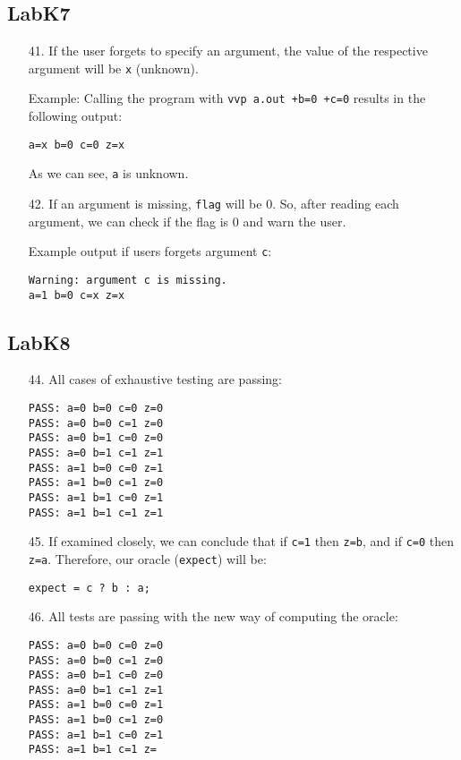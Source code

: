 \documentclass{article}
\begin{document}
\subsection{LabK7}
\begin{enumerate}
\item[41. ] If the user forgets to specify an argument, the value of the respective argument will be \verb$x$ (unknown).

Example: Calling the program with \verb$vvp a.out +b=0 +c=0$ results in the following output:
\begin{verbatim}
a=x b=0 c=0 z=x
\end{verbatim}

As we can see, \verb$a$ is unknown.

\item[42. ] If an argument is missing, \verb$flag$ will be 0. So, after reading each argument, we can check if the flag is 0 and warn the user.

Example output if users forgets argument \verb$c$:
\begin{verbatim}
Warning: argument c is missing.
a=1 b=0 c=x z=x
\end{verbatim}

\end{enumerate}

\subsection{LabK8}
\begin{enumerate}
\item[44. ] All cases of exhaustive testing are passing:
\begin{verbatim}
PASS: a=0 b=0 c=0 z=0
PASS: a=0 b=0 c=1 z=0
PASS: a=0 b=1 c=0 z=0
PASS: a=0 b=1 c=1 z=1
PASS: a=1 b=0 c=0 z=1
PASS: a=1 b=0 c=1 z=0
PASS: a=1 b=1 c=0 z=1
PASS: a=1 b=1 c=1 z=1
\end{verbatim}

\item[45. ] If examined closely, we can conclude that if \verb$c=1$ then \verb$z=b$, and if \verb$c=0$ then \verb$z=a$. Therefore, our oracle (\verb$expect$) will be:

\verb$expect = c ? b : a;$

\item[46. ] All tests are passing with the new way of computing the oracle:
\begin{verbatim}
PASS: a=0 b=0 c=0 z=0
PASS: a=0 b=0 c=1 z=0
PASS: a=0 b=1 c=0 z=0
PASS: a=0 b=1 c=1 z=1
PASS: a=1 b=0 c=0 z=1
PASS: a=1 b=0 c=1 z=0
PASS: a=1 b=1 c=0 z=1
PASS: a=1 b=1 c=1 z=
\end{verbatim}
\end{enumerate}
\end{document}
